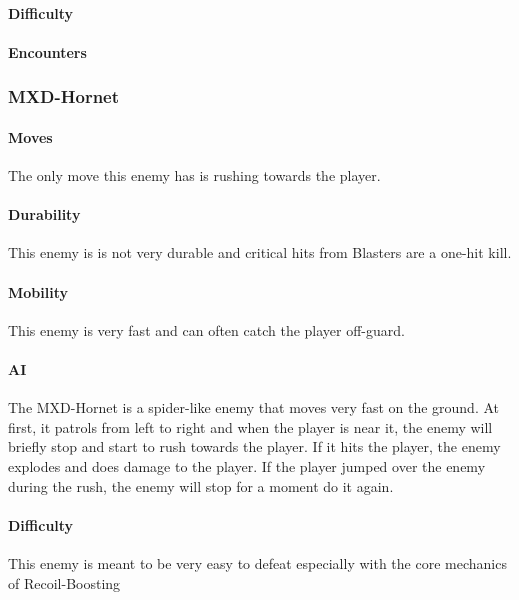 \documentclass[12pt]{article}
\begin{document}
\paragraph{Difficulty}

\paragraph{Encounters}

\subsubsection{MXD-Hornet}

\paragraph{Moves}

The only move this enemy has is rushing towards the player.

\paragraph{Durability}

This enemy is is not very durable and critical hits from Blasters are a one-hit kill.

\paragraph{Mobility}

This enemy is very fast and can often catch the player off-guard. 

\paragraph{AI}

The MXD-Hornet is a spider-like enemy that moves very fast on the ground. At first, it patrols from left to right and when the player is near it, the enemy will briefly stop and start to rush towards the player. If it hits the player, the enemy explodes and does damage to the player. If the player jumped over the enemy during the rush, the enemy will stop for a moment do it again. 

\paragraph{Difficulty}

This enemy is meant to be very easy to defeat especially with the core mechanics of Recoil-Boosting
\end{document}
